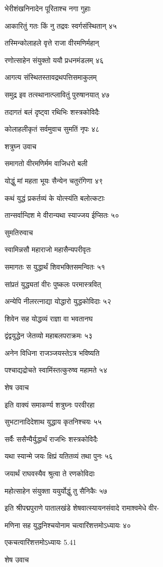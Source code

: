 भेरीशंखनिनादेन पूरिताश्च नगा गुहाः

आकारितुं गतः किं नु तद्रवः स्वर्गसंस्थितान् ४५

तस्मिन्कोलाहले वृत्ते राजा वीरमणिर्महान्

रणोत्साहेन संयुक्तो ययौ प्रधनमंडलम् ४६

आगत्य संस्थितस्तावद्रथपत्तिसमाकुलम्

समुद्र इव तत्स्थानात्प्लावितुं पुरुषानयात् ४७

तदागतं बलं दृष्ट्वा रथिभिः शस्त्रकोविदैः

कोलाहलीकृतं सर्वमुवाच सुमतिं नृपः ४८

शत्रुघ्न उवाच

समागतो वीरमणिर्मम वाजिधरो बली

योद्धुं मां महता भूयः सैन्येन चतुरंगिणा ४९

कथं युद्धं प्रकर्तव्यं के योत्स्यंति बलोत्कटाः

तान्सर्वान्दिश मे वीरान्यथा स्याज्जय ईप्सितः ५०

सुमतिरुवाच

स्वामिन्नसौ महाराजो महासैन्यपरीवृतः

समागतः स युद्धार्थं शिवभक्तिसमन्वितः ५१

सांप्रतं युद्ध्यतां वीरः पुष्कलः परमास्त्रवित्

अन्येपि नीलरत्नाद्या योद्धारो युद्धकोविदाः ५२

शिवेन सह योद्धव्यं राज्ञा वा भवतानघ

द्वंद्वयुद्धेन जेतव्यो महाबलपराक्रमः ५३

अनेन विधिना राजञ्जयस्तेऽत्र भविष्यति

पश्चाद्यद्रोचते स्वामिंस्तत्कुरुष्व महामते ५४

शेष उवाच

इति वाक्यं समाकर्ण्य शत्रुघ्नः परवीरहा

सुभटानादिदेशाथ युद्धाय कृतनिश्चयः ५५

सर्वैः ससैन्यैर्युद्धार्थं राजभिः शस्त्रकोविदैः

यथा स्यान्मे जयः क्षिप्रं यतितव्यं तथा पुनः ५६

जयार्थं राघवस्यैव श्रुत्वा ते रणकोविदाः

महोत्साहेन संयुक्ता ययुर्योद्धुं तु सैनिकैः ५७

इति श्रीपद्मपुराणे पातालखंडे शेषवात्स्यायनसंवादे रामाश्वमेधे वीर-

मणिना सह युद्धनिश्चयोनाम चत्वारिंशत्तमोऽध्यायः ४०

एकचत्वारिंशत्तमोऽध्यायः 5.41

शेष उवाच


